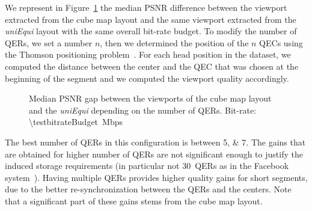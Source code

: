 We represent in Figure~\ref{fig:QEC} the median \ac{PSNR} difference
between the viewport extracted from the cube map layout and the
same viewport extracted from the \emph{uniEqui} layout with the same
overall bit-rate budget. To modify the number of \acp{QER}, we set a
number $n$, then we determined the position of the $n$ \acp{QEC}
using the Thomson positioning problem~\cite{rakhmanov1994electrons}.
For each head position in the dataset, we computed the distance
between the \FoV{} center and the \ac{QEC} that was chosen at the
beginning of the segment and we computed the viewport quality
accordingly.


\begin{figure}
\centering

\caption{Median \acs{PSNR} gap between the viewports of the cube map layout and the \textit{uniEqui} depending
on the number of \acp{QER}.
Bit-rate: \SI{\testbitrateBudget}{\mega bps}}
\label{fig:QEC}
\end{figure}

The best number of \acp{QER} in this configuration is between
\numlist{5;7}. The gains that are obtained for higher number of
\acp{QER} are not significant enough to justify the induced storage
requirements (in particular not $30$~\acp{QER} as in the Facebook
system~\cite{facebook}). Having multiple  \acp{QER} provides higher
quality gains for short segments, due to the better re-synchronization
between the \acp{QER} and the \FoV{} centers. Note %
that a
significant part of these gains stems from the cube map layout. %
